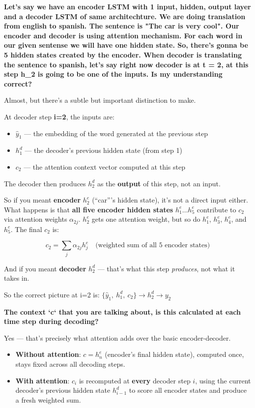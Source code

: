 \textbf{Let's say we have an encoder LSTM with 1 input, hidden, output layer and a decoder LSTM of same architechture. We are doing translation from english to spanish. The sentence is "The car is very cool". Our encoder and decoder is using attention mechanism. For each word in our given sentense we will have one hidden state. So, there's gonna be 5 hidden states created by the encoder. When decoder is translating the sentence to spanish, let's say right now decoder is at t = 2, at this step h\_2 is going to be one of the inputs. Is my understanding correct?}

Almost, but there's a subtle but important distinction to make.

At decoder step \textbf{i=2}, the inputs are:

\begin{itemize}
    \item $\hat{y}_1$ --- the embedding of the word generated at the previous step
    \item $h_1^d$ --- the decoder's previous hidden state (from step 1)
    \item $c_2$ --- the attention context vector computed at this step
\end{itemize}

The decoder then produces $h_2^d$ as the \textbf{output} of this step, not an input.

So if you meant \textbf{encoder} $h_2^e$ (``car'''s hidden state), it's not a direct input either. What happens is that \textbf{all five encoder hidden states} $h_1^e \ldots h_5^e$ contribute to $c_2$ via attention weights $\alpha_{2j}$. $h_2^e$ gets one attention weight, but so do $h_1^e$, $h_3^e$, $h_4^e$, and $h_5^e$. The final $c_2$ is:

$$c_2 = \sum_j \alpha_{2j} h_j^e \quad \text{(weighted sum of all 5 encoder states)}$$

And if you meant \textbf{decoder} $h_2^d$ --- that's what this step \textit{produces}, not what it takes in.

So the correct picture at i=2 is: $\{\hat{y}_1,\ h_1^d,\ c_2\} \rightarrow h_2^d \rightarrow y_2$

\bigskip

\textbf{The context `c` that you are talking about, is this calculated at each time step during decoding?}

Yes --- that's precisely what attention adds over the basic encoder-decoder.

\begin{itemize}
    \item \textbf{Without attention}: $c = h_n^e$ (encoder's final hidden state), computed once, stays fixed across all decoding steps.
    \item \textbf{With attention}: $c_i$ is recomputed at \textbf{every} decoder step $i$, using the current decoder's previous hidden state $h_{i-1}^d$ to score all encoder states and produce a fresh weighted sum.
\end{itemize}


